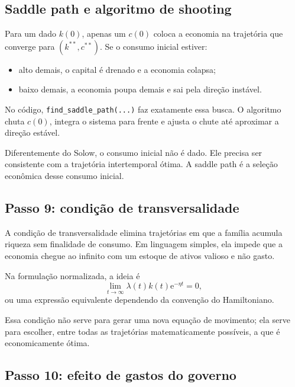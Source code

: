 \documentclass[11pt,a4paper]{article}
\newcommand{\E}{\mathrm{e}}
\begin{document}
\subsection{Saddle path e algoritmo de shooting}

Para um dado \(k(0)\), apenas um \(c(0)\) coloca a economia na trajet\'oria
que converge para \((k^{\ast\ast},c^{\ast\ast})\). Se o consumo inicial estiver:
\begin{itemize}
  \item alto demais, o capital \'e drenado e a economia colapsa;
  \item baixo demais, a economia poupa demais e sai pela dire\c{c}\~ao inst\'avel.
\end{itemize}

No c\'odigo, \texttt{find\_saddle\_path(...)} faz exatamente essa busca. O
algoritmo chuta \(c(0)\), integra o sistema para frente e ajusta o chute at\'e
aproximar a dire\c{c}\~ao est\'avel.

\begin{intuicao}
Diferentemente do Solow, o consumo inicial n\~ao \'e dado. Ele precisa ser
consistente com a trajet\'oria intertemporal \'otima. A saddle path \'e a
sele\c{c}\~ao econ\^omica desse consumo inicial.
\end{intuicao}

\subsection{Passo 9: condi\c{c}\~ao de transversalidade}

A condi\c{c}\~ao de transversalidade elimina trajet\'orias em que a fam\'ilia
acumula riqueza sem finalidade de consumo. Em linguagem simples, ela impede
que a economia chegue ao infinito com um estoque de ativos valioso e n\~ao
gasto.

Na formula\c{c}\~ao normalizada, a ideia \'e
\[
\lim_{t\to\infty}\lambda(t)k(t)\E^{-\eta t}=0,
\]
ou uma express\~ao equivalente dependendo da conven\c{c}\~ao do Hamiltoniano.

Essa condi\c{c}\~ao n\~ao serve para gerar uma nova equa\c{c}\~ao de movimento;
ela serve para escolher, entre todas as trajet\'orias matematicamente
poss\'iveis, a que \'e economicamente \'otima.

\subsection{Passo 10: efeito de gastos do governo}
\end{document}

